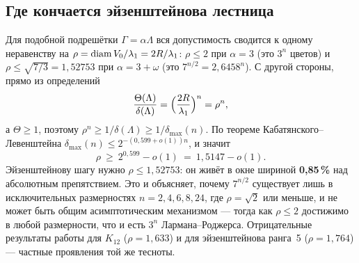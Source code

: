 \subsection{Где кончается эйзенштейнова лестница}
\label{ssec:kl}

Для подобной подрешётки $\Gamma=\alpha\Lambda$ вся допустимость сводится к
одному неравенству на $\rho=\operatorname{diam} V_0/\lambda_1=2R/\lambda_1$: $\rho\le2$ при
$\alpha=3$ (это $3^n$ цветов) и $\rho\le\sqrt{7/3}=1{,}52753$ при
$\alpha=3+\omega$ (это $7^{n/2}=2{,}6458^n$). С другой стороны, прямо из
определений
\begin{equation}\label{eq:rhoid}
\frac{\Theta(\Lambda)}{\delta(\Lambda)}
=\Bigl(\frac{2R}{\lambda_1}\Bigr)^{n}=\rho^{n},
\end{equation}
а $\Theta\ge1$, поэтому $\rho^n\ge1/\delta(\Lambda)\ge1/\delta_{\max}(n)$. По
теореме Кабатянского--Левенштейна $\delta_{\max}(n)\le2^{-(0{,}599+o(1))n}$, и
значит
\[
\rho\ \ge\ 2^{0{,}599}-o(1)\ =\ 1{,}5147-o(1).
\]
Эйзенштейнову шагу нужно $\rho\le1{,}52753$: он живёт в окне шириной
\textbf{0{,}85\,\%} над абсолютным препятствием. Это и объясняет, почему
$7^{n/2}$ существует лишь в исключительных размерностях $n=2,4,6,8,24$, где
$\rho=\sqrt2$ или меньше, и не может быть общим асимптотическим механизмом ---
тогда как $\rho\le2$ достижимо в любой размерности, что и есть $3^n$
Лармана--Роджерса. Отрицательные результаты работы для $K_{12}$
($\rho=1{,}633$) и для эйзенштейнова ранга~5 ($\rho=1{,}764$) --- частные
проявления той же тесноты.
